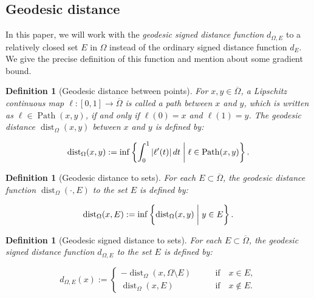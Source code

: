 \documentclass[11pt]{article}
\numberwithin{equation}{section}
\newtheorem{defn}[theorem]{Definition}
\newcommand{\closure}[1]{\overline{#1}}
\begin{document}
\subsection{Geodesic distance}
In this paper, we will work with the \textit{geodesic signed distance function} $d_{\Omega,E}$ to a relatively closed set $E$ in $\Omega$
instead of the ordinary signed distance function $d_E$. We give the precise definition of this function and mention about some gradient bound.

\begin{defn}[Geodesic distance between points]
    For $x,y\in\closure{\Omega}$,
    a Lipschitz continuous map $\ell:[0,1]\to\closure{\Omega}$ is called a \emph{path} between $x$ and $y$, which is written as $\ell\in\operatorname{Path}(x,y)$,
    if and only if $\ell(0) = x$ and $\ell(1) = y$. The geodesic distance $\operatorname{dist}_\Omega(x,y)$ between $x$ and $y$ is defined by:

    \begin{equation}
        \label{eq:geodesic-distance}
    \operatorname{dist}_\Omega(x,y) := \inf\left\{\int_0^1|\ell'(t)|\,dt\biggm| \ell\in\operatorname{Path}(x,y)\right\}.
    \end{equation}
\end{defn}

\begin{defn}[Geodesic distance to sets]
    For each $E\subset\closure{\Omega}$, the \emph{geodesic distance function} $\operatorname{dist}_\Omega(\cdot,E)$ to the set $E$ is defined by:

    \[
    \operatorname{dist}_\Omega(x,E) := \inf\left\{\operatorname{dist}_{\Omega}(x,y)\biggm| y\in E\right\}.
    \]
\end{defn}

\begin{defn}[Geodesic signed distance to sets]
    For each $E\subset\closure{\Omega}$, the \emph{geodesic signed distance function} $d_{\Omega,E}$ to the set $E$ is defined by:

    \begin{equation*}
        d_{\Omega,E}(x) :=
        \begin{cases}
            -\operatorname{dist}_{\Omega}(x,\Omega\setminus E) & \qquad \mbox{if}\quad x\in E,\\
            \operatorname{dist}_\Omega(x,E) & \qquad \mbox{if}\quad x\notin E.
        \end{cases}
    \end{equation*}
\end{defn}
\end{document}

